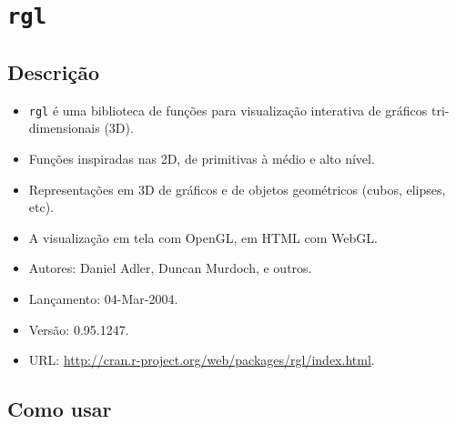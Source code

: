 \section{\texttt{rgl}}

\subsection{Descrição}


\begin{frame}

  \begin{itemize}
  \item \texttt{rgl} é uma biblioteca de funções para visualização
    interativa de gráficos tri-dimensionais (3D).
  \item Funções inspiradas nas 2D, de primitivas à médio e alto nível.
  \item Representações em 3D de gráficos e de objetos geométricos
    (cubos, elipses, etc).
  \item A visualização em tela com OpenGL, em HTML com WebGL.
  \end{itemize}

  \begin{itemize}
  \item Autores: Daniel Adler, Duncan Murdoch, e outros.
  \item Lançamento: 04-Mar-2004.
  \item Versão: 0.95.1247.
  \item URL: \url{http://cran.r-project.org/web/packages/rgl/index.html}.
\end{itemize}

\end{frame}


\subsection{Como usar}

\frame{
  
}


